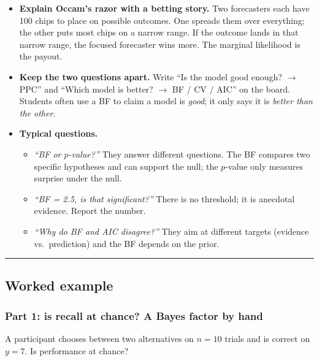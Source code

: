 \begin{itemize}
\tightlist
\item
  \textbf{Explain Occam's razor with a betting story.} Two forecasters
  each have 100 chips to place on possible outcomes. One spreads them
  over everything; the other puts most chips on a narrow range. If the
  outcome lands in that narrow range, the focused forecaster wins more.
  The marginal likelihood is the payout.
\item
  \textbf{Keep the two questions apart.} Write ``Is the model good
  enough? \ensuremath{\rightarrow} PPC'' and ``Which model is better? \ensuremath{\rightarrow} BF / CV / AIC'' on the
  board. Students often use a BF to claim a model is \emph{good}; it
  only says it is \emph{better than the other}.
\item
  \textbf{Typical questions.}

  \begin{itemize}
  \tightlist
  \item
    \emph{``BF or \(p\)-value?''} They answer different questions. The
    BF compares two specific hypotheses and can support the null; the
    \(p\)-value only measures surprise under the null.
  \item
    \emph{``BF = 2.5, is that significant?''} There is no threshold; it
    is anecdotal evidence. Report the number.
  \item
    \emph{``Why do BF and AIC disagree?''} They aim at different targets
    (evidence vs.~prediction) and the BF depends on the prior.
  \end{itemize}
\end{itemize}

\begin{center}\rule{0.5\linewidth}{0.5pt}\end{center}


\subsection{Worked example}

\subsubsection{Part 1: is recall at chance? A Bayes factor by hand}

A participant chooses between two alternatives on \(n = 10\) trials and
is correct on \(y = 7\). Is performance at chance?

